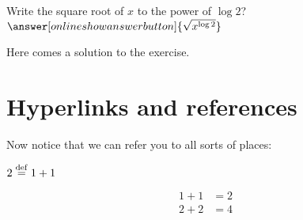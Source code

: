 \documentclass{ximera}
\begin{document}
\begin{exercise}
\begin{question}
        Write the square root of $x$ to the power of $\log 2$?  $\answer[onlineshowanswerbutton]{\sqrt{x^{\log 2}}}$
		\begin{solution}[show]
			Here comes a solution to the exercise.
		\end{solution}
	\end{question}
\end{exercise}

\section{Hyperlinks and references}

Now notice that we can refer you to all sorts of places: 
\begin{definition}\label{itm:showCase:def1} $2 \overset{\mathrm{def}}{=} 1+1$
\end{definition}	

\begin{align}
 1 + 1 & = 2 \label{links_test1} \\
 2 + 2 & = 4 \label{links_test2}
\end{align}
\end{document}
